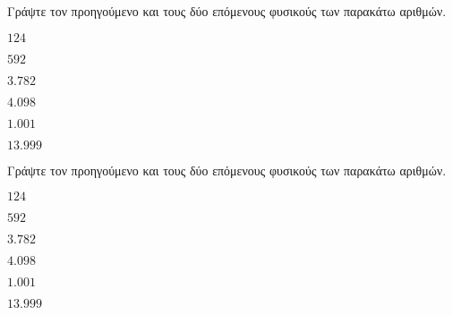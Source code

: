 Γράψτε τον προηγούμενο και τους δύο επόμενους φυσικούς των παρακάτω αριθμών.
\begin{multicols}{3}
\begin{rlist}
\item $ 124 $
\item $ 592 $
\item $ 3.782 $
\item $ 4.098 $
\item $ 1.001 $
\item $ 13.999 $
\end{rlist}
\end{multicols}
Γράψτε τον προηγούμενο και τους δύο επόμενους φυσικούς των παρακάτω αριθμών.
\begin{multicols}{3}
\begin{rlist}
\item $ 124 $
\item $ 592 $
\item $ 3.782 $
\item $ 4.098 $
\item $ 1.001 $
\item $ 13.999 $
\end{rlist}
\end{multicols}
